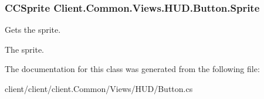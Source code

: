 \subsubsection[{Sprite}]{\setlength{\rightskip}{0pt plus 5cm}C\+C\+Sprite Client.\+Common.\+Views.\+H\+U\+D.\+Button.\+Sprite\hspace{0.3cm}{\ttfamily [get]}}\label{classClient_1_1Common_1_1Views_1_1HUD_1_1Button_af54794ccd8b52fb26b6bb1e164521323}


Gets the sprite. 

The sprite.

The documentation for this class was generated from the following file\+:\begin{DoxyCompactItemize}
\item 
client/client/client.\+Common/\+Views/\+H\+U\+D/Button.\+cs\end{DoxyCompactItemize}

